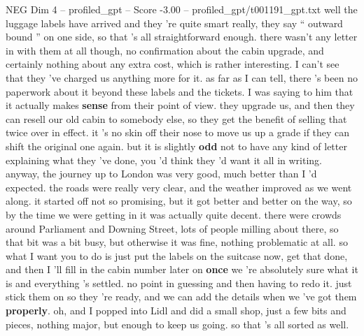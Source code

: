 \begin{textsample}{NEG Dim 4 – profiled\_gpt – Score -3.00 – profiled\_gpt/t001191\_gpt.txt}  \label{ex:f4_neg_008}
well the luggage labels have arrived and they ’re quite smart really, they say “ outward bound ” on one side, so that ’s all straightforward enough. there wasn't any letter in with them at all though, no confirmation about the cabin upgrade, and certainly nothing about any extra cost, which is rather interesting.
I can't see that they ’ve charged us anything more for it. as far as I can tell, there ’s been no paperwork about it beyond these labels and the tickets.
I was saying to him that it actually makes \textbf{sense} from their point of view. they upgrade us, and then they can resell our old cabin to somebody else, so they get the benefit of selling that twice over in effect. it ’s no skin off their nose to move us up a grade if they can shift the original one again. but it is slightly \textbf{odd} not to have any kind of letter explaining what they ’ve done, you ’d think they ’d want it all in writing. anyway, the journey up to London was very good, much better than I ’d expected. the roads were really very clear, and the weather improved as we went along. it started off not so promising, but it got better and better on the way, so by the time we were getting in it was actually quite decent. there were crowds around Parliament and Downing Street, lots of people milling about there, so that bit was a bit busy, but otherwise it was fine, nothing problematic at all. so what I want you to do is just put the labels on the suitcase now, get that done, and then I ’ll fill in the cabin number later on \textbf{once} we ’re absolutely sure what it is and everything ’s settled. no point in guessing and then having to redo it. just stick them on so they ’re ready, and we can add the details when we ’ve got them \textbf{properly}. oh, and I popped into Lidl and did a small shop, just a few bits and pieces, nothing major, but enough to keep us going. so that ’s all sorted as well.

\end{textsample}

